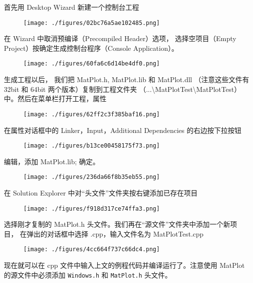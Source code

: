 首先用 Desktop Wizard 新建一个控制台工程
\begin{figure}[ht]
\centering
\texttt{[image: ./figures/02bc76a5ae102485.png]}
\caption{} \label{fig_MtPlot_9}
\end{figure}

在 Wizard 中取消预编译（Precompiled Header）选项， 选择空项目（Empty Project）按确定生成控制台程序（Console Application）。

\begin{figure}[ht]
\centering
\texttt{[image: ./figures/60fa6c6d14be4df0.png]}
\caption{} \label{fig_MtPlot_10}
\end{figure}

生成工程以后， 我们把 MatPlot.h, MatPlot.lib 和 MatPlot.dll （注意这些文件有 32bit 和 64bit 两个版本）复制到工程文件夹 （...\textbackslash MatPlotTest\textbackslash MatPlotTest）中。然后在菜单栏打开工程，属性

\begin{figure}[ht]
\centering
\texttt{[image: ./figures/62ff2c3f385baf16.png]}
\caption{} \label{fig_MtPlot_11}
\end{figure}

在属性对话框中的 Linker，Input，Additional Dependencies 的右边按下拉按钮

\begin{figure}[ht]
\centering
\texttt{[image: ./figures/b13ce00458175f73.png]}
\caption{} \label{fig_MtPlot_12}
\end{figure}

编辑，添加 MatPlot.lib; 确定。

\begin{figure}[ht]
\centering
\texttt{[image: ./figures/236da66f8b35eb55.png]}
\caption{} \label{fig_MtPlot_13}
\end{figure}

在 Solution Explorer 中对“头文件”文件夹按右键添加已存在项目

\begin{figure}[ht]
\centering
\texttt{[image: ./figures/f918d317ce74ffa3.png]}
\caption{} \label{fig_MtPlot_14}
\end{figure}

选择刚才复制的 MatPlot.h 头文件。我们再在“源文件”文件夹中添加一个新项目， 在弹出的对话框中选择 .cpp，输入文件名为 MatPlotTest.cpp

\begin{figure}[ht]
\centering
\texttt{[image: ./figures/4cc664f737c66dc4.png]}
\caption{} \label{fig_MtPlot_15}
\end{figure}

现在就可以在 cpp 文件中输入上文的例程代码并编译运行了。注意使用 MatPlot 的源文件中必须添加 \verb|Windows.h| 和 \verb|MatPlot.h| 头文件。

